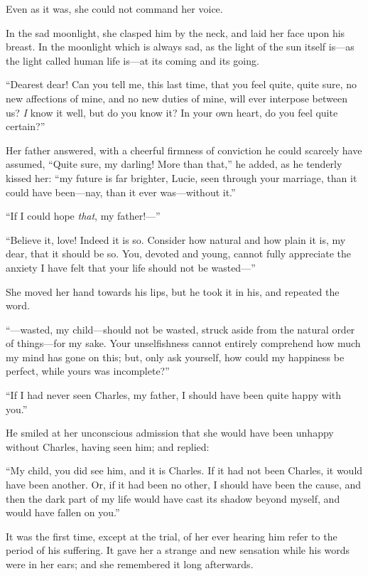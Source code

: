 Even as it was, she could not command her voice.

In the sad moonlight, she clasped him by the neck, and laid her face
upon his breast.  In the moonlight which is always sad, as the light
of the sun itself is---as the light called human life is---at its
coming and its going.

``Dearest dear!  Can you tell me, this last time, that you feel quite,
quite sure, no new affections of mine, and no new duties of mine,
will ever interpose between us?  \emph{I} know it well, but do you know it?
In your own heart, do you feel quite certain?''

Her father answered, with a cheerful firmness of conviction he could
scarcely have assumed, ``Quite sure, my darling!  More than that,''
he added, as he tenderly kissed her:  ``my future is far brighter,
Lucie,  seen through your marriage, than it could have been---nay,
than it  ever was---without it.''

``If I could hope \emph{that}, my father!---''

``Believe it, love!  Indeed it is so.  Consider how natural and how
plain it is, my dear, that it should be so.  You, devoted and young,
cannot fully appreciate the anxiety I have felt that your life
should not be wasted---''

She moved her hand towards his lips, but he took it in his,
and repeated the word.

``---wasted, my child---should not be wasted, struck aside from the
natural order of things---for my sake.  Your unselfishness cannot
entirely comprehend how much my mind has gone on this; but, only ask
yourself, how could my happiness be perfect, while yours was incomplete?''

``If I had never seen Charles, my father, I should have been quite
happy with you.''

He smiled at her unconscious admission that she would have been unhappy
without Charles, having seen him; and replied:

``My child, you did see him, and it is Charles.  If it had not been
Charles, it would have been another.  Or, if it had been no other,
I should have been the cause, and then the dark part of my life would
have cast its shadow beyond myself, and would have fallen on you.''

It was the first time, except at the trial, of her ever hearing him refer
to the period of his suffering.  It gave her a strange and new sensation
while his words were in her ears; and she remembered it long afterwards.

